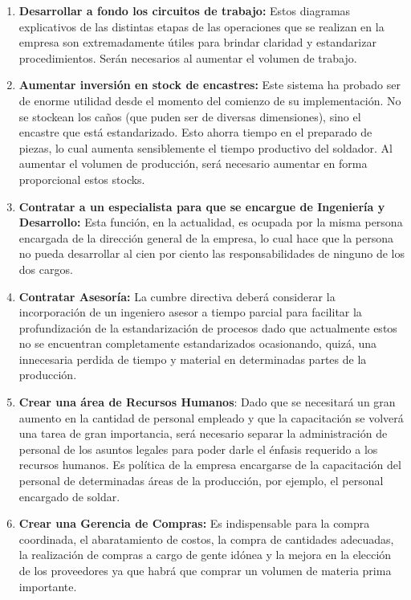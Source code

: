 \documentclass[a4paper,10pt,titlepage]{article}
\begin{document}
\begin{enumerate}
\item \textbf{Desarrollar a fondo los circuitos de trabajo:} Estos diagramas explicativos de las distintas etapas de las operaciones que se realizan en la empresa son extremadamente \'utiles para brindar claridad y estandarizar procedimientos. Ser\'an necesarios al aumentar el volumen de trabajo.

\item \textbf{Aumentar inversi\'on en stock de encastres:} Este sistema ha probado ser de enorme utilidad desde el momento del comienzo de su implementaci\'on. No se stockean los ca\~nos (que puden ser de diversas dimensiones), sino el encastre que está estandarizado. Esto ahorra tiempo en el preparado de piezas, lo cual aumenta sensiblemente el tiempo productivo del soldador. Al aumentar el volumen de producci\'on, ser\'a necesario aumentar en forma proporcional estos stocks.

\item \textbf{Contratar a un especialista para que se encargue de Ingenier\'ia y Desarrollo:} Esta funci\'on, en la actualidad, es ocupada por la misma persona encargada de la direcci\'on general de la empresa, lo cual hace que la persona no pueda desarrollar al cien por ciento las responsabilidades de ninguno de los dos cargos.

\item \textbf{Contratar Asesor\'ia:} La cumbre directiva deber\'a considerar la incorporaci\'on de un ingeniero asesor a tiempo parcial para facilitar la profundizaci\'on de la estandarizaci\'on de procesos dado que actualmente estos no se encuentran completamente estandarizados ocasionando, quizá, una innecesaria perdida de tiempo y material en determinadas partes de la producción.

\item \textbf{Crear una \'area de Recursos Humanos}: Dado que se necesitar\'a un gran aumento en la cantidad de personal empleado y que la capacitaci\'on se volver\'a una tarea de gran importancia, ser\'a necesario separar la administraci\'on de personal de los asuntos legales para poder darle el \'enfasis requerido a los recursos humanos. Es política de la empresa encargarse de la capacitación del personal de determinadas áreas de la producción, por ejemplo, el personal encargado de soldar. 

\item \textbf{Crear una Gerencia de Compras:} Es indispensable para la compra coordinada, el abaratamiento de costos, la compra de cantidades adecuadas, la realizaci\'on de compras a cargo de gente id\'onea y la mejora en la elecci\'on de los proveedores ya que habrá que comprar un volumen de materia prima importante.


\end{enumerate}
\end{document}

